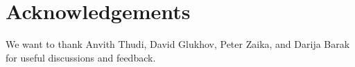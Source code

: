 \section*{Acknowledgements}

We want to thank Anvith Thudi, David Glukhov, Peter Zaika, and Darija Barak for useful discussions and feedback. 
